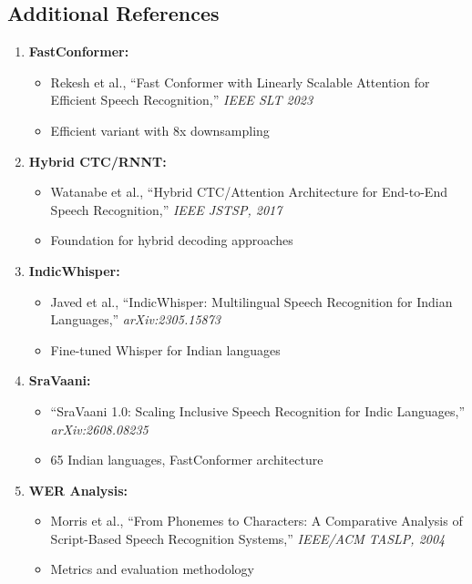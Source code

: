 \documentclass[12pt,a4paper]{article}
\begin{document}
\subsection{Additional References}

\begin{enumerate}[leftmargin=*]
\item \textbf{FastConformer:}
  \begin{itemize}
  \item Rekesh et al., ``Fast Conformer with Linearly Scalable Attention for Efficient Speech Recognition,'' \textit{IEEE SLT 2023}
  \item Efficient variant with 8x downsampling
  \end{itemize}

\item \textbf{Hybrid CTC/RNNT:}
  \begin{itemize}
  \item Watanabe et al., ``Hybrid CTC/Attention Architecture for End-to-End Speech Recognition,'' \textit{IEEE JSTSP, 2017}
  \item Foundation for hybrid decoding approaches
  \end{itemize}

\item \textbf{IndicWhisper:}
  \begin{itemize}
  \item Javed et al., ``IndicWhisper: Multilingual Speech Recognition for Indian Languages,'' \textit{arXiv:2305.15873}
  \item Fine-tuned Whisper for Indian languages
  \end{itemize}

\item \textbf{SraVaani:}
  \begin{itemize}
  \item ``SraVaani 1.0: Scaling Inclusive Speech Recognition for Indic Languages,'' \textit{arXiv:2608.08235}
  \item 65 Indian languages, FastConformer architecture
  \end{itemize}

\item \textbf{WER Analysis:}
  \begin{itemize}
  \item Morris et al., ``From Phonemes to Characters: A Comparative Analysis of Script-Based Speech Recognition Systems,'' \textit{IEEE/ACM TASLP, 2004}
  \item Metrics and evaluation methodology
  \end{itemize}


\end{enumerate}
\end{document}
